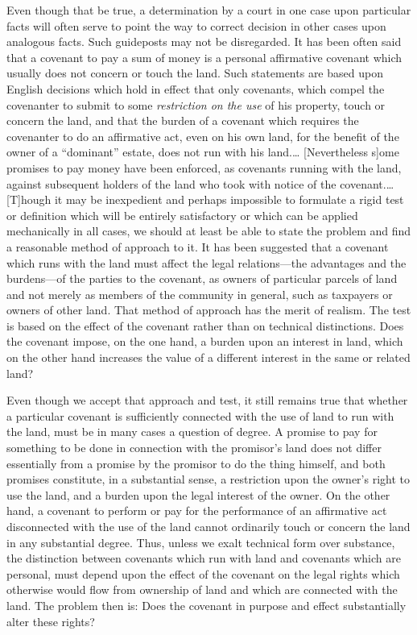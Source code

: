 Even though that be true, a determination by a court in one case upon particular
facts will often serve to point the way to correct decision in other cases upon
analogous facts. Such guideposts may not be disregarded. It has been often said
that a covenant to pay a sum of money is a personal affirmative covenant which
usually does not concern or touch the land. Such statements are based upon
English decisions which hold in effect that only covenants, which compel the
covenanter to submit to some \textit{restriction on the use} of his property,
touch or concern the land, and that the burden of a covenant which requires the
covenanter to do an affirmative act, even on his own land, for the benefit of
the owner of a ``dominant'' estate, does not run with his land.\ldots
[Nevertheless s]ome promises to pay money have been enforced, as covenants
running with the land, against subsequent holders of the land who took with
notice of the covenant.\ldots [T]hough it may be inexpedient and perhaps
impossible to formulate a rigid test or definition which will be entirely
satisfactory or which can be applied mechanically in all cases, we should at
least be able to state the problem and find a reasonable method of approach to
it. It has been suggested that a covenant which runs with the land must affect
the legal relations---the advantages and the burdens---of the parties to the
covenant, as owners of particular parcels of land and not merely as members of
the community in general, such as taxpayers or owners of other land. That method
of approach has the merit of realism. The test is based on the effect of the
covenant rather than on technical distinctions. Does the covenant impose, on the
one hand, a burden upon an interest in land, which on the other hand increases
the value of a different interest in the same or related land?

Even though we accept that approach and test, it still remains true that whether
a particular covenant is sufficiently connected with the use of land to run with
the land, must be in many cases a question of degree. A promise to pay for
something to be done in connection with the promisor's land does not differ
essentially from a promise by the promisor to do the thing himself, and both
promises constitute, in a substantial sense, a restriction upon the owner's
right to use the land, and a burden upon the legal interest of the owner. On the
other hand, a covenant to perform or pay for the performance of an affirmative
act disconnected with the use of the land cannot ordinarily touch or concern the
land in any substantial degree. Thus, unless we exalt technical form over
substance, the distinction between covenants which run with land and covenants
which are personal, must depend upon the effect of the covenant on the legal
rights which otherwise would flow from ownership of land and which are connected
with the land. The problem then is: Does the covenant in purpose and effect
substantially alter these rights?


